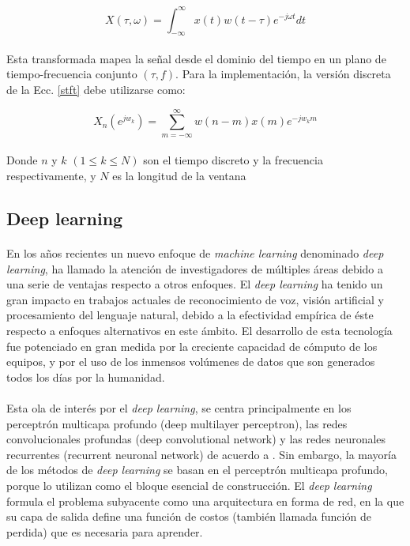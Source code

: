 \documentclass[12pt]{article}%
\begin{document}
\begin{equation}
\label{stft}
X(\tau,\omega)=\int_{-\infty}^{\infty}x(t)w(t-\tau)e^{-j\omega{t}}dt
\end{equation}

\paragraph{}
Esta transformada mapea la señal desde el dominio del tiempo en un plano de tiempo-frecuencia conjunto $(\tau,f)$. Para la implementación, la versión discreta de la Ecc. \ref{stft} debe utilizarse como:

\begin{equation}
X_{n}(e^{jw_{k}})=\sum_{m=-\infty}^{\infty}w(n-m)x(m)e^{-jw_{k}m}
\end{equation}

\paragraph{}
Donde $n$ y $k$ $(1{\leq}k{\leq}N)$ son el tiempo discreto y la frecuencia respectivamente, y $N$ es la longitud de la ventana

\subsection{Deep learning}
\paragraph{}

En los años recientes un nuevo enfoque de \textit{machine learning} denominado \textit{deep learning}, ha llamado la atención de investigadores de múltiples áreas debido a una serie de ventajas respecto a otros enfoques. El \textit{deep learning} ha tenido un gran impacto en trabajos actuales de reconocimiento de voz, visión artificial y procesamiento del lenguaje natural, debido a la efectividad empírica de éste respecto a enfoques alternativos en este ámbito. El desarrollo de esta tecnología fue potenciado en gran medida por la creciente capacidad de cómputo de los equipos, y por el uso de los inmensos volúmenes de datos que son generados todos los días por la humanidad.

\paragraph{}
Esta ola de interés por el \textit{deep learning}, se centra principalmente en los perceptrón multicapa profundo (deep multilayer perceptron), las redes convolucionales profundas (deep convolutional network) y las redes neuronales recurrentes (recurrent neuronal network) de acuerdo a \cite{mining}. Sin embargo, la mayoría de los métodos de \textit{deep learning} se basan en el perceptrón multicapa profundo, porque lo utilizan como el bloque esencial de construcción. El \textit{deep learning} formula el problema subyacente como una arquitectura en forma de red, en la que su capa de salida define una función de costos (también llamada función de perdida) que es necesaria para aprender.
\end{document}
